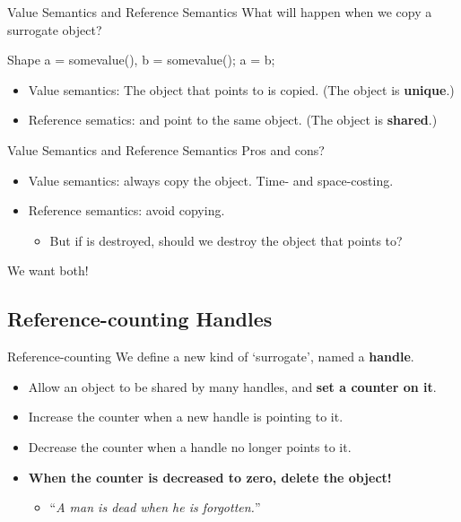 \documentclass{beamer}
\begin{document}
\begin{frame}[fragile]{Value Semantics and Reference Semantics}
    What will happen when we copy a surrogate object?
    \begin{cpp}
Shape a = somevalue(), b = somevalue();
a = b;
    \end{cpp}
    \begin{itemize}
        \item Value semantics: The object that  points to is copied. (The object is \textbf{unique}.)
        \item Reference sematics:  and  point to the same object. (The object is \textbf{shared}.)
    \end{itemize}
\end{frame}

\begin{frame}{Value Semantics and Reference Semantics}
    Pros and cons?
    \begin{itemize}
        \item Value semantics: always copy the object. Time- and space-costing.
        \item Reference semantics: avoid copying.
        \begin{itemize}
            \item But if  is destroyed, should we destroy the object that  points to?
        \end{itemize}
    \end{itemize}
    \pause
    We want both!
\end{frame}

\subsection{Reference-counting Handles}

\begin{frame}{Reference-counting}
    We define a new kind of `surrogate', named a \textbf{handle}.
    \begin{itemize}
        \item Allow an object to be shared by many handles, and \textbf{set a counter on it}.
        \item Increase the counter when a new handle is pointing to it.
        \item Decrease the counter when a handle no longer points to it.
        \item \textbf{When the counter is decreased to zero, delete the object!}
        \begin{itemize}
            \item ``\textit{A man is dead when he is forgotten.}''
        \end{itemize}
    \end{itemize}
\end{frame}
\end{document}
